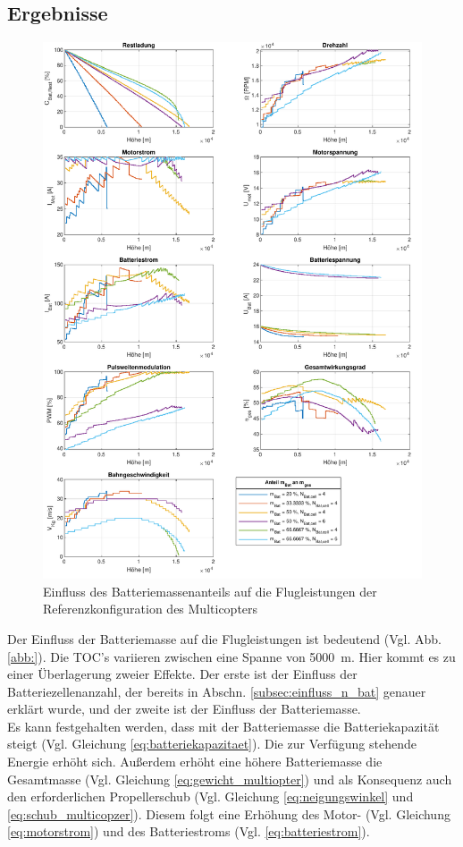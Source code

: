 \subsection{Ergebnisse}
\label{subsec:ergebnis_massenverteilung}
\newpage
\begin{figure}[H]
\centering
	\includegraphics[scale=0.70]{Diagramme/Batteriemasse.pdf}
	\caption{Einfluss des Batteriemassenanteils auf die Flugleistungen der Referenzkonfiguration des Multicopters}
	\label{abb:batteriemasse}
\end{figure}

Der Einfluss der Batteriemasse auf die Flugleistungen ist bedeutend (Vgl. Abb. \ref{abb:}). Die TOC's variieren zwischen eine Spanne von \SI{5000}{m}. Hier kommt es zu einer Überlagerung zweier Effekte. Der erste ist der Einfluss der Batteriezellenanzahl, der bereits in Abschn. \ref{subsec:einfluss_n_bat} genauer erklärt wurde, und der zweite ist der Einfluss der Batteriemasse. \\
Es kann festgehalten werden, dass mit der Batteriemasse die Batteriekapazität steigt (Vgl. Gleichung \ref{eq:batteriekapazitaet}). Die zur Verfügung stehende Energie erhöht sich. Außerdem erhöht eine höhere Batteriemasse die Gesamtmasse (Vgl. Gleichung \ref{eq:gewicht_multiopter}) und als Konsequenz auch den erforderlichen Propellerschub (Vgl. Gleichung \ref{eq:neigungswinkel} und \ref{eq:schub_multicopzer}). Diesem folgt eine Erhöhung des Motor- (Vgl. Gleichung \ref{eq:motorstrom}) und des Batteriestroms (Vgl. \ref{eq:batteriestrom}).

